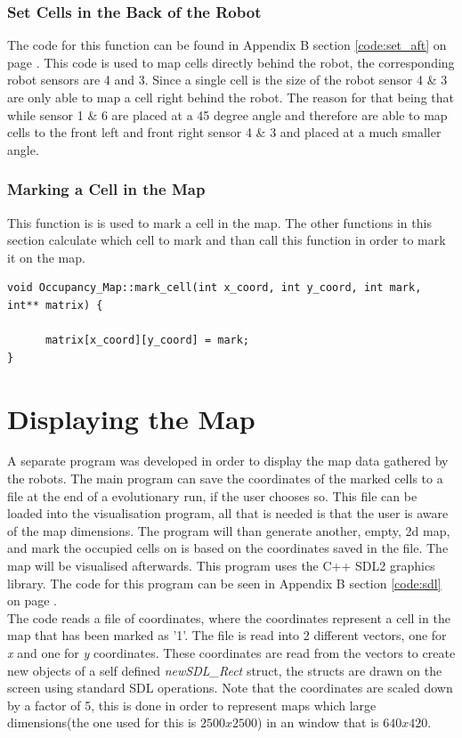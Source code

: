 \subsubsection{Set Cells in the Back of the Robot}
The code for this function can be found in Appendix B section \ref{code:set_aft} on page \pageref{code:set_aft}. 
This code is used to map cells directly behind the robot, the corresponding robot sensors are 4 and 3. 
Since a single cell is the size of the robot sensor 4 \& 3 are only able to map a cell right behind the robot. The reason for that being that while sensor 1 \& 6 are placed at a 45 degree angle and therefore are able to map cells to the front left and front right sensor 4 \& 3 and placed at a much smaller angle. 

\subsubsection{Marking a Cell in the Map}
This function is is used to mark a cell in the map. The other functions in this section calculate which cell to mark and than call this function in order to mark it on the map.

\begin{lstlisting}[caption = {Mark a Cell on the Map}]
void Occupancy_Map::mark_cell(int x_coord, int y_coord, int mark, int** matrix) {

      matrix[x_coord][y_coord] = mark;
}
\end{lstlisting}

\section{Displaying the Map}
\label{chap3:sdl}
A separate program was developed in order to display the map data gathered by the robots. The main program can save the coordinates of the marked cells to a file at the end of a evolutionary run, if the user chooses so. 
This file can be loaded into the visualisation program, all that is needed is that the user is aware of the map dimensions. 
The program will than generate another, empty, 2d map, and mark the occupied cells on is based on the coordinates saved in the file. 
The map will be visualised afterwards.
This program uses the C++ SDL2 graphics library. 
The code for this program can be seen in Appendix B section \ref{code:sdl} on page \pageref{code:sdl}.\\

The code reads a file of coordinates, where the coordinates represent a cell in the map that has been marked as '1'.
The file is read into 2 different vectors, one for \textit{x} and one for \textit{y} coordinates. These coordinates are read from the vectors to create new objects of a self defined \textit{newSDL\_Rect} struct, the structs are drawn on the screen using standard SDL operations. 
Note that the coordinates are scaled down by a factor of 5, this is done in order to represent maps which large dimensions(the one used for this is $2500 x 2500$) in an window that is $640 x 420$. 

